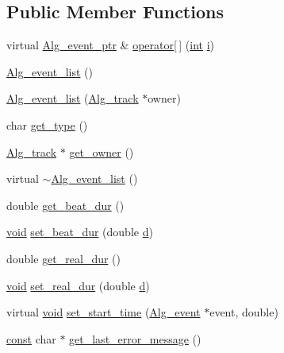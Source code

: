 \subsection*{Public Member Functions}
\begin{DoxyCompactItemize}
\item 
virtual \hyperlink{allegro_8h_aeb8db009b4ffadef2e7ca0e4936f0307}{Alg\+\_\+event\+\_\+ptr} \& \hyperlink{class_alg__event__list_a6964a7599aeb5ece772f80f0330990bc}{operator\mbox{[}$\,$\mbox{]}} (\hyperlink{xmltok_8h_a5a0d4a5641ce434f1d23533f2b2e6653}{int} \hyperlink{checksum_8c_ab80e330a3bc9e38c1297fe17381e92b4}{i})
\item 
\hyperlink{class_alg__event__list_a2cbf5b6504c559edda6a6175b88ddccf}{Alg\+\_\+event\+\_\+list} ()
\item 
\hyperlink{class_alg__event__list_abf42939e6a8b50d3ff99977e35e132c1}{Alg\+\_\+event\+\_\+list} (\hyperlink{class_alg__track}{Alg\+\_\+track} $\ast$owner)
\item 
char \hyperlink{class_alg__event__list_aed21c54de575437ce6a60625ac6a8cc2}{get\+\_\+type} ()
\item 
\hyperlink{class_alg__track}{Alg\+\_\+track} $\ast$ \hyperlink{class_alg__event__list_a43fe317c60b230e0a31f715f3df1602d}{get\+\_\+owner} ()
\item 
virtual \hyperlink{class_alg__event__list_a039b042332bbaf034b7328bc8fd47f24}{$\sim$\+Alg\+\_\+event\+\_\+list} ()
\item 
double \hyperlink{class_alg__event__list_a496becb17280d4fc40a4f922e3f2764f}{get\+\_\+beat\+\_\+dur} ()
\item 
\hyperlink{sound_8c_ae35f5844602719cf66324f4de2a658b3}{void} \hyperlink{class_alg__event__list_a6f7e0a569e4ecdb55dff501501e7ff68}{set\+\_\+beat\+\_\+dur} (double \hyperlink{poly-fir_8h_a2530554172d8629149ec56816eeaa947}{d})
\item 
double \hyperlink{class_alg__event__list_ad37edb787e09cd6bf2b8e00d20fd15e6}{get\+\_\+real\+\_\+dur} ()
\item 
\hyperlink{sound_8c_ae35f5844602719cf66324f4de2a658b3}{void} \hyperlink{class_alg__event__list_ae55cc11d0a033658e34ebcf21c023ff6}{set\+\_\+real\+\_\+dur} (double \hyperlink{poly-fir_8h_a2530554172d8629149ec56816eeaa947}{d})
\item 
virtual \hyperlink{sound_8c_ae35f5844602719cf66324f4de2a658b3}{void} \hyperlink{class_alg__event__list_a46a3d4ab871197000f43a8ef8f0d4197}{set\+\_\+start\+\_\+time} (\hyperlink{class_alg__event}{Alg\+\_\+event} $\ast$event, double)
\item 
\hyperlink{getopt1_8c_a2c212835823e3c54a8ab6d95c652660e}{const} char $\ast$ \hyperlink{class_alg__event__list_a9e683d10d7ec399d06dd78f527bb3630}{get\+\_\+last\+\_\+error\+\_\+message} ()
\end{DoxyCompactItemize}
